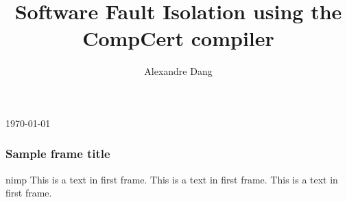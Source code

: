 \documentclass{beamer}
\title{Software Fault Isolation using the CompCert compiler}
\author{Alexandre Dang}
\institute{Team Celtique}
\begin{document}
\today
\frame{\titlepage}
 
\begin{frame}
\frametitle{Sample frame title}
nimp
This is a text in first frame. This is a text in first frame. This is a text in first frame.
\end{frame}
 
\end{document}
